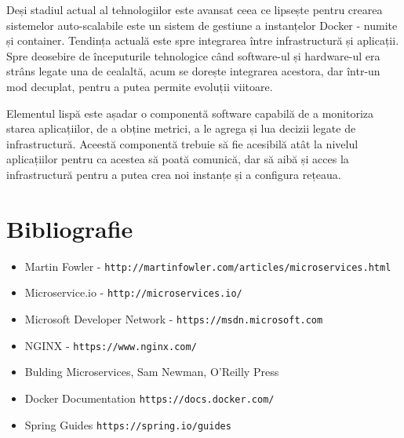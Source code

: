 \documentclass[12pt, a4paper, oneside, romanian]{teza-upb}
\begin{document}
Deși stadiul actual al tehnologiilor este avansat ceea ce lipsește pentru crearea sistemelor auto-scalabile este un sistem de gestiune a instanțelor Docker - numite și container. Tendința actuală este spre integrarea între infrastructură și aplicații. Spre deosebire de începuturile tehnologice când software-ul și hardware-ul era strâns legate una de cealaltă, acum se dorește integrarea acestora, dar într-un mod decuplat, pentru a putea permite evoluții viitoare.

Elementul lispă este așadar o componentă software capabilă de a monitoriza starea aplicațiilor, de a obține metrici, a le agrega și lua decizii legate de infrastructură. Aceestă componentă trebuie să fie acesibilă atât la nivelul aplicațiilor pentru ca acestea să poată comunică, dar să aibă și acces la infrastructură pentru a putea crea noi instanțe și a configura rețeaua. 


\chapter{Bibliografie}

\begin{itemize}
 \item Martin Fowler - \texttt{http://martinfowler.com/articles/microservices.html}
 \item Microservice.io - \texttt{http://microservices.io/}
 \item Microsoft Developer Network - \texttt{https://msdn.microsoft.com}
 \item NGINX - \texttt{https://www.nginx.com/}
 \item Bulding Microservices, Sam Newman, O'Reilly Press
 \item Docker Documentation \texttt{https://docs.docker.com/}
 \item Spring Guides \texttt{https://spring.io/guides}
\end{itemize}	
\end{document}
